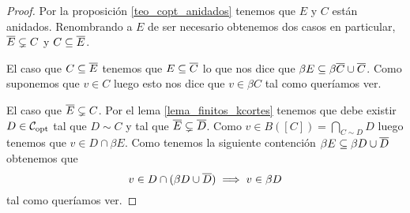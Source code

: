 \documentclass[tesis.tex]{subfiles}
\begin{document}
\begin{proof}
	Por la proposición \ref{teo_copt_anidados} tenemos que $E$ y $C$ están anidados.
	Renombrando a $E$ de ser necesario obtenemos dos casos en particular, $\overline E \subsetneq C$ y $C \subseteq \overline E$.
	
	El caso que $C \subseteq \overline E$ tenemos que $ E \subseteq \overline C$ lo que nos dice que $\beta E \subseteq \beta \overline C \cup \overline C$.
	Como suponemos que $v \in C$ luego esto nos dice que $v \in \beta C$ tal como queríamos ver.
	
	El caso que $\overline E \subsetneq C$.
	Por el lema \ref{lema_finitos_kcortes} tenemos que debe existir $D \in {\cal C}_{\text{opt}}$ tal que $D \sim C$ y tal que $\overline E \subsetneq \overline D$.
	Como $v \in B([C]) = \bigcap_{C \sim D} D $ luego tenemos que $v \in D \cap \beta E$.
	Como tenemos la siguiente contención $\beta E \subseteq \beta D \cup \overline D$ obtenemos que
	\[
		v \in D \cap (\beta D \cup \overline D) \implies v \in \beta D
	\]
	tal como queríamos ver. 
\end{proof}
\end{document}
